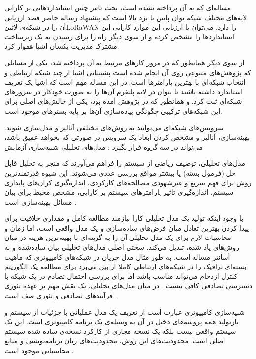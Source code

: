 مساله‌ای که به آن پرداخته نشده است، بحث تاثیر چنین استاندارد‌هایی بر کارایی لایه‌های مختلف شبکه توان پایین با برد بالا است که پیشنهاد رساله حاضر قصد ارزیابی آن را
در شبکه‌ی ‌لاتین{LoRaWAN} را دارد.
می‌توان با ارزیابی این موارد کارایی این استانداردها را مشخص کرده و از سوی دیگر راه را برای رسیدن به یک زیرساخت مشترک مدیریت یکسان اشیا هموار کرد.

از سوی دیگر همانطور که در مرور کارهای مرتبط به آن پرداخته شد،
یکی از مسائلی که پژوهش‌های متنوعی روی آن انجام شده است پشتیبانی اشیا از چند شبکه ارتباطی و انتخاب شبکه‌ای با بهترین
پارامترها است. در این مساله مهم است که اشیا یک تعریف استاندارد داشته باشند تا بتوان در لایه پلتفرم آن‌ها را به صورت خودکار در سرورهای شبکه‌ای ثبت کرد.
و همانطور که در پژوهش  آمده بود، یکی از چالش‌های اصلی برای این شبکه‌های ترکیبی چگونگی پیاده‌سازی آن‌ها بر پایه بسترهای موجود است.


سرویس‌های شبکه‌ای می‌توانند به روش‌های مختلفی آنالیز و مدل‌سازی شوند.
بهینه‌سازی، آنالیز و مشخص کردن ابعاد یک سرویس در صورتی که بخواهد عمیق باشد، می‌تواند در سه گروه قرار بگیرد
:
 مدل‌های تحلیلی
 شبیه‌سازی
 آزمایش

مدل‌های تحلیلی، توصیف ریاضی از سیستم را فراهم می‌آورند که منجر به تحلیل قابل حل (فرمول بسته) یا بیشتر مواقع بررسی عددی می‌شوند.
این شیوه قدرتمند‌ترین روش برای فهم سریع و غیرشهودی مصالحه‌های کارکردی، اندازه‌گیری کران‌های پایداری سیستم،
اندازه‌گیری تاثیر پارامترهای سیستم بر کارایی، مشخص محیط برای بیان مسائل بهینه‌سازی است
.

با وجود اینکه تولید یک مدل تحلیلی کارا نیازمند مطالعه کامل و مقداری خلاقیت برای پیدا کردن بهترین تعادل میان
فرض‌های ساده‌سازی و یک مدل واقعی است، اما زمان و محاسبات لازم برای یک مدل تحلیلی آن را به گزینه‌ای با بهینه‌ترین
هزینه در میان روش‌های یاد شده، تبدیل می‌کند.
سختی اصلی مدل‌های تحلیلی بیان ساده‌شده و نه آسانتر مساله است. به طور مثال مدل جریان در شبکه‌های کامپیوتری
که ماهیت بسته‌ای ترافیک را در شبکه‌های ارتباطی کاملا از بین می‌برد برای مطالعه یک الگوریتم کنترل ازدحام می‌تواند
مناسب باشد اما برای بررسی احتمال تصادم در یک شبکه با دسترسی تصادفی کافی نیست
.
در میان مدل‌های تحلیلی، یک نقش مهم بر عهده تئوری فرآیندهای تصادفی و تئوری صف است
.

شبیه‌سازی کامپیوتری عبارت است از تعریف یک مدل عملیاتی با جزئیات از سیستم و بازتولید
همه پروسه‌های دخیل در آن به وسیله‌ی یک برنامه کامپیوتری است.
این یک سیستم واقعی نیست بلکه یک نسخه مجازی از کارکرد نسخه‌ی ساده شده سیستم اصلی است.
محدودیت‌های این روش، محدودیت‌های زبان برنامه‌نویسی و منابع محاسباتی موجود است
.

